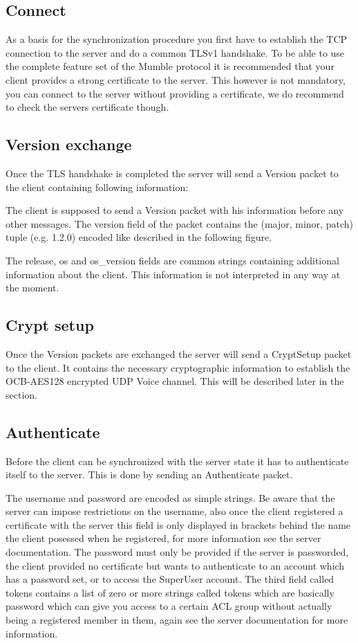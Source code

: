 \documentclass[11pt]{article} %
\begin{document}
\subsection{Connect}
As a basis for the synchronization procedure you first have to establish the TCP connection to the server and do a common TLSv1 handshake. To be able to use the complete feature set of the Mumble protocol it is recommended that your client provides a strong certificate to the server. This however is not mandatory, you can connect to the server without providing a certificate, we do recommend to check the servers certificate though.

\subsection{Version exchange}
Once the TLS handshake is completed the server will send a Version packet to the client containing following information:


The client is supposed to send a Version packet with his information before any other messages. The version field of the packet  contains the (major, minor, patch) tuple (e.g. 1.2.0) encoded like described in the following figure.


The release, os and os\_version fields are common strings containing additional information about the client. This information is not interpreted in any way at the moment.

\subsection{Crypt setup}
Once the Version packets are exchanged the server will send a CryptSetup packet to the client. It contains the necessary cryptographic information to establish the OCB-AES128 encrypted UDP Voice channel. This will be described later in the section.

\subsection{Authenticate}
Before the client can be synchronized with the server state it has to authenticate itself to the server. This is done by sending an Authenticate packet.


The username and password are encoded as simple strings. Be aware that the server can impose restrictions on the username, also once the client registered a certificate with the server this field is only displayed in brackets behind the name the client posessed when he registered, for more information see the server documentation. The password must only be provided if the server is passworded, the client provided no certificate but wants to authenticate to an account which has a password set, or to access the SuperUser account. The third field called tokens contains a list of zero or more strings called tokens which are basically password which can give you access to a certain ACL group without actually being a registered member in them, again see the server documentation for more information.
\end{document}
